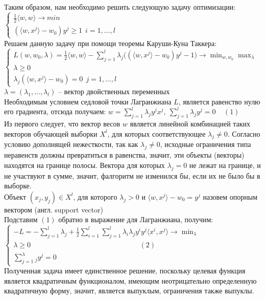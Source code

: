 \documentclass[12pt, twoside]{article}
\begin{document}
Таким образом, нам необходимо решить следующую задачу оптимизации:\\
$\begin{cases}\frac{1}{2} \langle w, w \rangle \rightarrow min \\ (\langle w, x^j \rangle - w_0)y^j \geq 1 \ \ i = 1, \ldots, l \end{cases}$\\
Решаем данную задачу при помощи теоремы Каруши-Куна Таккера:\\
$\begin{cases} L(w,w_0,\lambda) = \frac{1}{2}\langle w, w \rangle - \sum\limits_{j=1}^l \lambda_j\big((\langle w, x^j \rangle - w_0)y^j -1\big) \rightarrow \min_{w,w_0}\max_{\lambda} \\ \lambda \geq 0 \\ \lambda_j(\langle w, x^j \rangle - w_0) = 0 \ \ j = 1, \ldots, l \end{cases}$\\
$\lambda = (\lambda_1, \ldots, \lambda_l)$ -- вектор двойственных переменных\\
Необходимым условием седловой точки Лагранжиана $L$, является равенство нулю его градиента, отсюда получаем:
 $w  = \sum\limits_{j=1}^l\lambda_jy^jx^j, \ \sum\limits_{j=1}^l \lambda_jy^j = 0 \ \ \ \ \ (1)$\\
Из первого следует, что вектор весов $w$ является линейной комбинацией таких векторов обучающей выборки $X^l$, для которых соответствующее $\lambda_j \neq 0$. Согласно условию дополнящей нежесткости, так как $\lambda_j \neq 0$, исходные ограничения типа неравенств должны превратиться в равенства, значит, эти объекты (векторы) находятся на границе полосы. Вектора для которых $\lambda_j = 0$ не лежат на границе, и не участвуют в сумме, значит, фалгоритм не изменился бы, если их не было бы в выборке.\\

Объект $(x_j, y_j) \in X^l$, для которого $\lambda_j > 0$ и $\langle w, x^j \rangle - w_0 = y^j$ назовем опорным вектором (англ. support vector)\\

Подставим $(1)$ обратно в выражение для Лагранжиана, получим:\\
$\begin{cases}
-L = -\sum\limits_{j=1}^l\lambda_j + \frac{1}{2}\sum\limits_{i=1}^l\sum\limits_{j=1}^l \lambda_i\lambda_jy^iy^j\langle x^i, x^j \rangle \rightarrow \min_{\lambda} \\
\lambda \geq 0 \ \ \ \ \ \ \ \ \ \ \ \ \ \ \ \ \ \  \ \ \ \ \ \ \ \ \ \ \ \ \ \ \ \ \ \ \ \ \ \ \ \ \ \ \ \ \ \ \ \ \ \ \ \ \ \ \ \ \ \  \ \ \ \ \ \ \ \ \ (2)\\
\sum\limits_{j=1}^ \lambda_j y^j = 0
\end{cases}$\\
Полученная задача имеет единственное решение, поскольку целевая функция является квадратичным функционалом, имеющим неотрицательно определенную квадратичную форму, значит, является выпуклым, ограничения также выпуклы.\\
\end{document}
